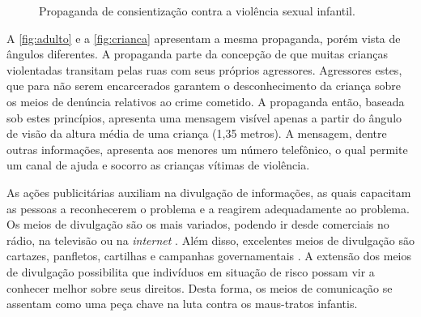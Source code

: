 \begin{figure}[htb]%
  \centering
  \caption{\label{fig:ad}Propaganda de consientização contra a violência sexual infantil.}%
  \hspace{0.01cm}
  \vspace{10pt}
  \label{fig:example}%
\end{figure}

A \autoref{fig:adulto} e a \autoref{fig:crianca} apresentam a mesma propaganda, porém vista de ângulos diferentes. A propaganda parte da concepção de que muitas crianças violentadas transitam pelas ruas com seus próprios agressores. Agressores estes, que para não serem encarcerados garantem o desconhecimento da criança sobre os meios de denúncia relativos ao crime cometido. A propaganda então, baseada sob estes princípios, apresenta uma mensagem visível apenas a partir do ângulo de visão da altura média de uma criança (1,35 metros). A mensagem, dentre outras informações, apresenta aos menores um número telefônico, o qual permite um canal de ajuda e socorro as crianças vítimas de violência. 

As ações publicitárias auxiliam na divulgação de informações, as quais capacitam as pessoas a reconhecerem o problema e a reagirem adequadamente ao problema. Os meios de divulgação são os mais variados, podendo ir desde comerciais no rádio, na televisão ou na \textit{internet} \cite{martinez2000prevencion}. Além disso, excelentes meios de divulgação são cartazes, panfletos, cartilhas e campanhas governamentais \cite{mendelson2015parent}. A extensão dos meios de divulgação possibilita que indivíduos em situação de risco possam vir a conhecer melhor sobre seus direitos. Desta forma, os meios de comunicação se assentam como uma peça chave na luta contra os maus-tratos infantis. 

